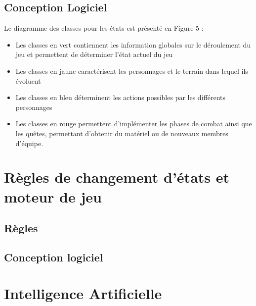 \documentclass[a4paper,12pt]{article}
\begin{document}
\subsection{Conception Logiciel}
Le diagramme des classes pour les états est présenté en Figure 5 : 
\begin{itemize}
\item Les classes en vert contiennent les information globales sur le déroulement du jeu et permettent de déterminer l'état actuel du jeu
\item Les classes en jaune caractérisent les personnages et le terrain dans lequel ils évoluent
\item Les classes en bleu déterminent les actions possibles par les différents personnages
\item Les classes en rouge permettent d'implémenter les phases de combat ainsi que les quêtes, permettant d'obtenir du matériel ou de nouveaux membres d'équipe.
\end{itemize}


\clearpage
\section{Règles de changement d'états et moteur de jeu}

\subsection{Règles}

\clearpage
\subsection{Conception logiciel}




\section{Intelligence Artificielle}
\end{document}
